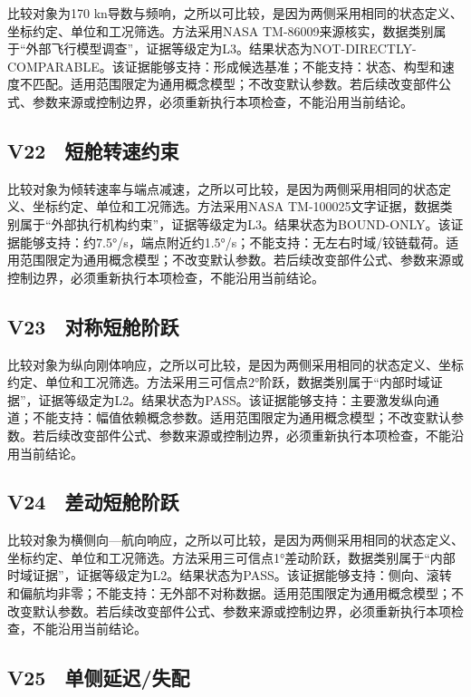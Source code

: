 \documentclass[UTF8,12pt,openany]{ctexbook}
\begin{document}
比较对象为170 kn导数与频响，之所以可比较，是因为两侧采用相同的状态定义、坐标约定、单位和工况筛选。方法采用NASA TM-86009来源核实，数据类别属于“外部飞行模型调查”，证据等级定为L3。结果状态为NOT-DIRECTLY-COMPARABLE。该证据能够支持：形成候选基准；不能支持：状态、构型和速度不匹配。适用范围限定为通用概念模型；不改变默认参数。若后续改变部件公式、参数来源或控制边界，必须重新执行本项检查，不能沿用当前结论。

\subsection{V22　短舱转速约束}

比较对象为倾转速率与端点减速，之所以可比较，是因为两侧采用相同的状态定义、坐标约定、单位和工况筛选。方法采用NASA TM-100025文字证据，数据类别属于“外部执行机构约束”，证据等级定为L3。结果状态为BOUND-ONLY。该证据能够支持：约7.5°/s，端点附近约1.5°/s；不能支持：无左右时域/铰链载荷。适用范围限定为通用概念模型；不改变默认参数。若后续改变部件公式、参数来源或控制边界，必须重新执行本项检查，不能沿用当前结论。

\subsection{V23　对称短舱阶跃}

比较对象为纵向刚体响应，之所以可比较，是因为两侧采用相同的状态定义、坐标约定、单位和工况筛选。方法采用三可信点2°阶跃，数据类别属于“内部时域证据”，证据等级定为L2。结果状态为PASS。该证据能够支持：主要激发纵向通道；不能支持：幅值依赖概念参数。适用范围限定为通用概念模型；不改变默认参数。若后续改变部件公式、参数来源或控制边界，必须重新执行本项检查，不能沿用当前结论。

\subsection{V24　差动短舱阶跃}

比较对象为横侧向—航向响应，之所以可比较，是因为两侧采用相同的状态定义、坐标约定、单位和工况筛选。方法采用三可信点1°差动阶跃，数据类别属于“内部时域证据”，证据等级定为L2。结果状态为PASS。该证据能够支持：侧向、滚转和偏航均非零；不能支持：无外部不对称数据。适用范围限定为通用概念模型；不改变默认参数。若后续改变部件公式、参数来源或控制边界，必须重新执行本项检查，不能沿用当前结论。

\subsection{V25　单侧延迟/失配}
\end{document}
